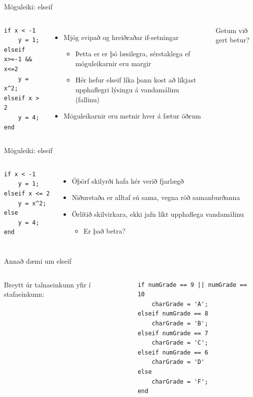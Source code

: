 \documentclass{beamer}
\begin{document}
\begin{frame}[fragile]{Möguleiki: elseif}
\begin{columns}
\begin{verbatim}
if x < -1
    y = 1;
elseif x>=-1 && x<=2
    y = x^2;
elseif x > 2
    y = 4;
end
\end{verbatim}
\begin{itemize}
 \item Mjög svipað og hreiðraðar if-setningar
 \begin{itemize}
  \item Þetta er er þó læsilegra, sérstaklega ef möguleikarnir eru margir
  \item Hér hefur elseif líka þann kost að líkjast upphaflegri lýsingu á vandamálinu (fallinu)
 \end{itemize}
 \item Möguleikarnir eru metnir hver á fætur öðrum
\end{itemize}
Getum við gert betur?
\end{columns}
\end{frame}

\begin{frame}[fragile]{Möguleiki: elseif}
\begin{columns}
\begin{verbatim}
if x < -1
    y = 1;
elseif x <= 2
    y = x^2;
else
    y = 4;
end
\end{verbatim}
\begin{itemize}
 \item Óþörf skilyrði hafa hér verið fjarlægð
 \item Niðurstaða er alltaf sú sama, vegna röð samanburðanna
 \item Örlítið skilvirkara, ekki jafn líkt upphaflega vandamálinu
 \begin{itemize}
  \item Er það betra?
 \end{itemize}
\end{itemize}
\end{columns}
\end{frame}

\begin{frame}[fragile]{Annað dæmi um elseif}
\begin{columns}
Breytt úr talnaeinkunn yfir í stafaeinkunn:
\begin{verbatim}
if numGrade == 9 || numGrade == 10
    charGrade = 'A';
elseif numGrade == 8
    charGrade = 'B';
elseif numGrade == 7
    charGrade = 'C';
elseif numGrade == 6
    charGrade = 'D'
else
    charGrade = 'F';
end
\end{verbatim}
\end{columns}
\end{frame}
\end{document}
